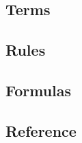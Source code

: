 \documentclass{article}
\begin{document}
  




  \subsection{Terms}

  \subsection{Rules}

  \subsection{Formulas}

  \subsection{Reference}


\end{document}
